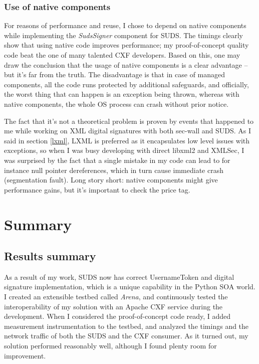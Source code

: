 \subsection{Use of native components}

For reasons of performance and reuse, I chose to depend on native components while implementing the \emph{SudsSigner} component for SUDS. The timings clearly show that using native code improves performance; my proof-of-concept quality code beat the one of many talented CXF developers. Based on this, one may draw the conclusion that the usage of native components is a clear advantage -- but it's far from the truth. The disadvantage is that in case of managed components, all the code runs protected by additional safeguards, and officially, the worst thing that can happen is an exception being thrown, whereas with native components, the whole OS process can crash without prior notice.

The fact that it's not a theoretical problem is proven by events that happened to me while working on XML digital signatures with both sec-wall and SUDS. As I said in section \ref{lxml}, LXML is preferred as it encapsulates low level issues with exceptions, so when I was busy developing with direct libxml2 and XMLSec, I was surprised by the fact that a single mistake in my code can lead to for instance null pointer dereferences, which in turn cause immediate crash (segmentation fault). Long story short: native components might give performance gains, but it's important to check the price tag.

\chapter{Summary}

\section{Results summary}

As a result of my work, SUDS now has correct UsernameToken and digital signature implementation, which is a unique capability in the Python SOA world. I created an extensible testbed called \emph{Arena}, and continuously tested the interoperability of my solution with an Apache CXF service during the development. When I considered the proof-of-concept code ready, I added measurement instrumentation to the testbed, and analyzed the timings and the network traffic of both the SUDS and the CXF consumer. As it turned out, my solution performed reasonably well, although I found plenty room for improvement.

